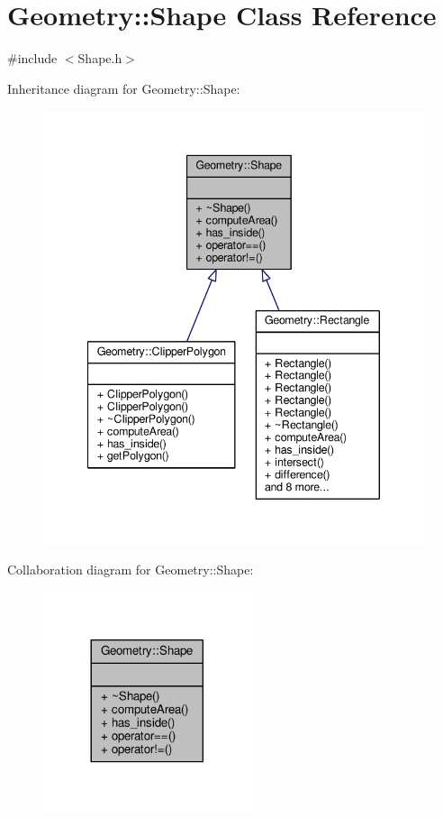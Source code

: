 \hypertarget{classGeometry_1_1Shape}{}\section{Geometry\+:\+:Shape Class Reference}
\label{classGeometry_1_1Shape}


{\ttfamily \#include $<$Shape.\+h$>$}



Inheritance diagram for Geometry\+:\+:Shape\+:\nopagebreak
\begin{figure}[H]
\begin{center}
\leavevmode
\includegraphics[width=340pt]{classGeometry_1_1Shape__inherit__graph}
\end{center}
\end{figure}


Collaboration diagram for Geometry\+:\+:Shape\+:\nopagebreak
\begin{figure}[H]
\begin{center}
\leavevmode
\includegraphics[width=173pt]{classGeometry_1_1Shape__coll__graph}
\end{center}
\end{figure}
